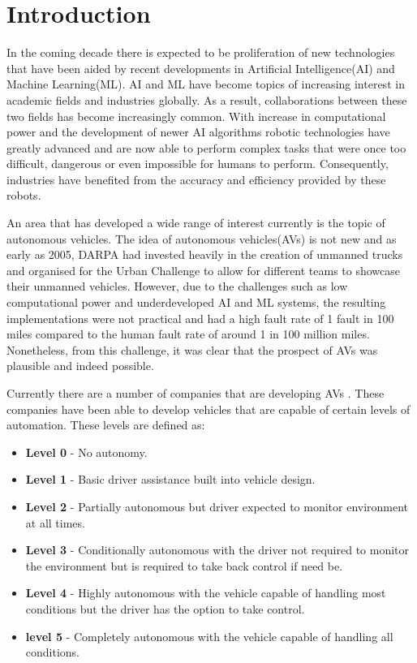 %
%
\let\textcircled=\pgftextcircled
\chapter{Introduction}
\label{chap:intro}

In the coming decade there is expected to be proliferation of new technologies that have been aided by recent developments in Artificial Intelligence(AI) and Machine Learning(ML). AI and ML have become topics of increasing interest in academic fields and industries globally. As a result, collaborations between these two fields has become increasingly common. 
With increase in computational power and the development of newer AI algorithms robotic technologies have greatly advanced and are now able to perform complex tasks that were once too difficult, dangerous or even impossible for humans to perform. Consequently, industries have benefited from the accuracy and efficiency provided by these robots. 

An area that has developed a wide range of interest currently is the topic of autonomous vehicles. The idea of autonomous vehicles(AVs) is not new and as early as 2005, DARPA had invested heavily in the creation of unmanned trucks and organised for the Urban Challenge \cite{buehler2009darpa} to allow for different teams to showcase their unmanned vehicles. However, due to the challenges such as low computational power and underdeveloped AI and ML systems, the resulting implementations were not practical and had a high fault rate of 1 fault in 100 miles compared to the human fault rate of around 1 in 100 million miles. Nonetheless, from this challenge, it was clear that the prospect of AVs was plausible and indeed possible. 

Currently there are a number of companies that are developing AVs . These companies have been able to develop vehicles that are capable of certain levels of automation. These levels are defined as:
\begin{itemize}
	\item \textbf{Level 0} - No autonomy. 
	\item \textbf{Level 1} - Basic driver assistance built into vehicle design.
	\item \textbf{Level 2} - Partially autonomous but driver expected to monitor environment at all times.
	\item \textbf{Level 3} - Conditionally autonomous with the driver not required to monitor the environment but is required to take back control if need be.
	\item \textbf{Level 4} - Highly autonomous with the vehicle capable of handling most conditions but the driver has the option to take control. 
	\item \textbf{level 5} - Completely autonomous with the vehicle capable of handling all conditions.
\end{itemize}


